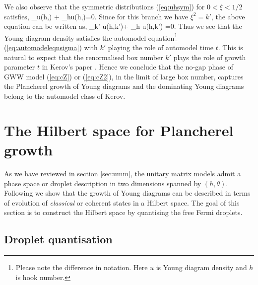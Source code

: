 \documentclass[final,3p,12pt,times]{elsarticle}
\numberwithin{equation}{section}
\begin{document}
We also observe that the symmetric distributions (\ref{eq:uhsym}) for $0<\xi<1/2$ satisfies,
%
\be\label{eq:automodeluh}
\dow_\xi u(h,\xi) + \dow_hu(h,\xi)=0.
\ee
%
Since for this branch we have $\xi^2=k'$, the above equation can be written as,
%
\be\label{eq:automodeluh2}
\dow_{k'} u(h,k')+ \dow_h u(h,k') =0.
\ee
%
Thus we see that the Young diagram density satisfies the automodel equation\footnote{Please note the difference in notation. Here $u$ is Young diagram density and $h$ is hook number.} (\ref{eq:automodeleqnsigma}) with $k'$ playing the role of automodel time $t$. This is natural to expect that the renormalised box number $k'$ plays the role of growth parameter $t$ in Kerov's paper \cite{Kerov1}. Hence we conclude that the no-gap phase of GWW model (\ref{eq:cZ}) or  (\ref{eq:cZ2}), in the limit of large box number, captures the Plancherel growth of Young diagrams and the dominating Young diagrams belong to the automodel class of Kerov.


\section{The Hilbert space for Plancherel growth}
\label{sec:hilbertspace}

As we have reviewed in section \ref{sec:umm}, the unitary matrix models admit a phase space or droplet description in two dimensions spanned by $(h,\theta)$. Following \cite{Chattopadhyay:2020rle} we show that the growth of Young diagrams can be described in terms of evolution of \emph{classical} or coherent states in a Hilbert space. The goal of this section is to construct the Hilbert space by quantising the free Fermi droplets.


\subsection{Droplet quantisation}\label{sec:fluctuation}
\end{document}
